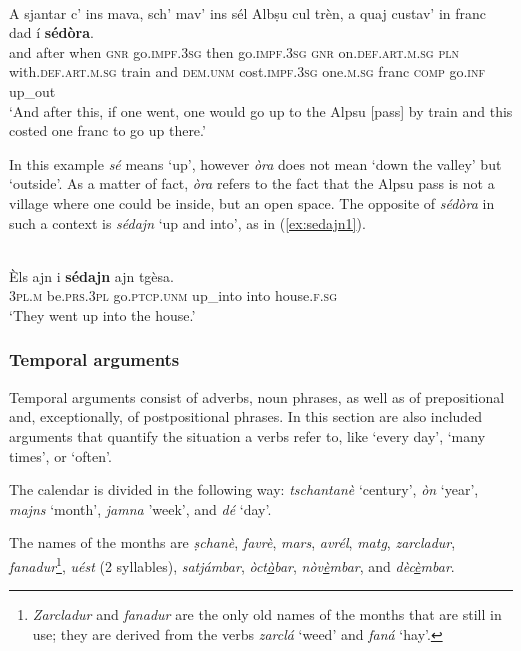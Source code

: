 \ea
\label{ex:sedora1}
\\
\gll    A sjantar c’ ins mava, sch’ mav’ ins sél Albṣu cul trèn, a quaj custav’ in franc dad í \textbf{sédòra}.\\
and after when \textsc{gnr}  go.\textsc{impf.3sg} then go.\textsc{impf.3sg} \textsc{gnr} on.\textsc{def.art.m.sg} \textsc{pln} with.\textsc{def.art.m.sg} train and \textsc{dem.unm} cost.\textsc{impf.3sg} one.\textsc{m.sg}  franc \textsc{comp} go.\textsc{inf} up\_out \\
\glt `And after this, if one went, one would go up to the Alpsu [pass] by train and this costed one franc to go up there.'
\z

In this example \textit{sé} means `up', however \textit{òra} does not mean `down the valley' but `outside'. As a matter of fact, \textit{òra} refers to the fact that the Alpsu pass is not a village where one could be inside, but an open space. The opposite of \textit{sédòra} in such a context is \textit{sédajn} `up and into', as in (\ref{ex:sedajn1}).

\ea
\label{ex:sedajn1}
\\
\gll Èls ajn i \textbf{sédajn} ajn tgèsa.\\
\textsc{3pl.m} be.\textsc{prs.3pl} go.\textsc{ptcp.unm} up\_into into house.\textsc{f.sg}\\
\glt `They went up into the house.'
\z

\subsubsection{Temporal arguments}
Temporal arguments consist of adverbs, noun phrases, as well as of prepositional and, exceptionally, of postpositional phrases. In this section are also included arguments that quantify the situation a verbs refer to, like `every day', `many times', or `often'.

The calendar is divided in the following way: \textit{tschantanè} `century', \textit{òn} `year', \textit{majns} `month', \textit{jamna} 'week', and \textit{dé} `day'.

The names of the months are \textit{ṣchanè}, \textit{favrè}, \textit{mars}, \textit{avrél}, \textit{matg}, \textit{zarcladur}, \textit{fanadur}\footnote{\textit{Zarcladur} and \textit{fanadur} are the only old names of the months that are still in use; they are derived from the verbs \textit{zarclá} `weed' and \textit{faná} `hay'.}, \textit{uést} (2 syllables), \textit{satjámbar}, \textit{òct\underline{ò}bar}, \textit{nòv\underline{è}mbar}, and \textit{dèc\underline{è}mbar}.

